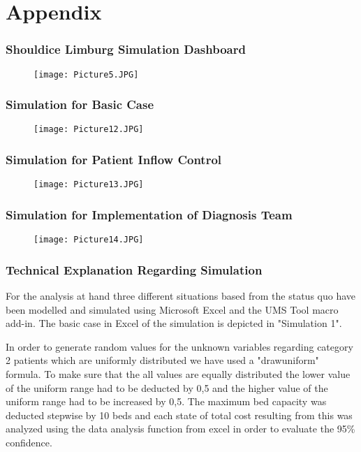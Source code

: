 \chapter{Appendix}
\subsection*{Shouldice Limburg Simulation Dashboard}
\begin{figure}[htpb]
	\centering
	\texttt{[image: Picture5.JPG]}
	\label{Dashboard}
\end{figure}
\newpage
\subsection*{Simulation for Basic Case}\label{sim1}
\begin{figure}[htpb]
	\centering
	\texttt{[image: Picture12.JPG]}
\end{figure}
\newpage
\subsection*{Simulation for Patient Inflow Control}
\begin{figure}[htpb]
	\centering
	\texttt{[image: Picture13.JPG]}
	\label{sim2}
\end{figure}
\newpage
\subsection*{Simulation for Implementation of Diagnosis Team}
\begin{figure}[htpb]
	\centering
	\texttt{[image: Picture14.JPG]}
	\label{sim3}
\end{figure}
\newpage
\subsection*{Technical Explanation Regarding Simulation}
For the analysis at hand three different situations based from the status quo have been modelled and simulated using Microsoft Excel and the UMS Tool macro add-in. The basic case in Excel of the simulation is depicted in "Simulation 1". 

In order to generate random values for the unknown variables regarding category 2 patients which are uniformly distributed we have used a "drawuniform" formula. To make sure that the all values are equally distributed the lower value of the uniform range had to be deducted by 0,5 and the higher value of the uniform range had to be increased by 0,5. The maximum bed capacity was deducted stepwise by 10 beds and each state of total cost resulting from this was analyzed using the data analysis function from excel in order to evaluate the 95\% confidence.

